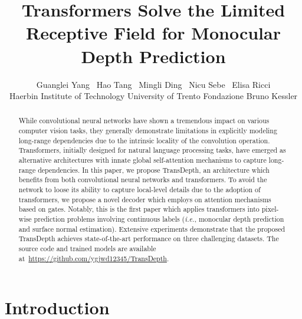 \documentclass[10pt,twocolumn,letterpaper]{article}
\begin{document}
\title{Transformers Solve the Limited Receptive Field for Monocular Depth Prediction}

\author{Guanglei Yang \ Hao Tang \ Mingli Ding \ Nicu Sebe \ Elisa Ricci\\
Haerbin Institute of Technology\quad
	University of Trento \quad
	Fondazione Bruno Kessler\\
}

\maketitle
\ificcvfinal\thispagestyle{empty}\fi

\begin{abstract}
While convolutional neural networks have shown a tremendous impact on various computer vision tasks, they generally demonstrate limitations in explicitly modeling long-range dependencies due to the intrinsic locality of the convolution operation. 
Transformers, initially designed for natural language processing tasks, have emerged as alternative architectures with innate global self-attention mechanisms to capture long-range dependencies.
In this paper, we propose TransDepth, an architecture which benefits from both convolutional neural networks and transformers.
To avoid the network to loose its ability to capture local-level details due to the adoption of transformers, we propose a novel decoder which employs on attention mechanisms based on gates. Notably, this is the first paper which applies transformers into pixel-wise prediction problems involving continuous labels (\textit{i.e.}, monocular depth prediction and surface normal estimation).
Extensive experiments demonstrate that the proposed TransDepth achieves state-of-the-art performance on three challenging datasets. The source code and trained models are available at~\url{https://github.com/ygjwd12345/TransDepth}.
\end{abstract} \section{Introduction}
\end{document}
